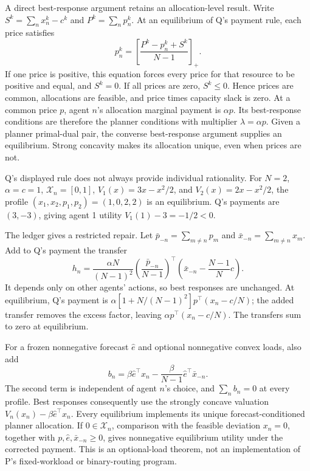 \documentclass{article}
\begin{document}
A direct best-response argument retains an allocation-level result. Write \(S^k=\sum_n x_n^k-c^k\) and \(P^k=\sum_n p_n^k\). At an equilibrium of Q's payment rule, each price satisfies
\[
p_n^k=\left[\frac{P^k-p_n^k+S^k}{N-1}\right]_+.
\]
If one price is positive, this equation forces every price for that resource to be positive and equal, and \(S^k=0\). If all prices are zero, \(S^k\leq0\). Hence prices are common, allocations are feasible, and price times capacity slack is zero. At a common price \(p\), agent \(n\)'s allocation marginal payment is \(\alpha p\). Its best-response conditions are therefore the planner conditions with multiplier \(\lambda=\alpha p\). Given a planner primal-dual pair, the converse best-response argument supplies an equilibrium. Strong concavity makes its allocation unique, even when prices are not. 

\begin{objection}
Q's displayed rule does not always provide individual rationality. For \(N=2\), \(\alpha=c=1\), \(\mathcal X_n=[0,1]\), \(V_1(x)=3x-x^2/2\), and \(V_2(x)=2x-x^2/2\), the profile \((x_1,x_2,p_1,p_2)=(1,0,2,2)\) is an equilibrium. Q's payments are \((3,-3)\), giving agent 1 utility \(V_1(1)-3=-1/2<0\). 
\end{objection}

The ledger gives a restricted repair. Let \(\bar p_{-n}=\sum_{m\ne n}p_m\) and \(\bar x_{-n}=\sum_{m\ne n}x_m\). Add to Q's payment the transfer
\[
h_n=
\frac{\alpha N}{(N-1)^2}
\left(\frac{\bar p_{-n}}{N-1}\right)^\top
\left(\bar x_{-n}-\frac{N-1}{N}c\right).
\]
It depends only on other agents' actions, so best responses are unchanged. At equilibrium, Q's payment is
\(\alpha[1+N/(N-1)^2]p^\top(x_n-c/N)\); the added transfer removes the excess factor, leaving \(\alpha p^\top(x_n-c/N)\). The transfers sum to zero at equilibrium. 

For a frozen nonnegative forecast \(\hat e\) and optional nonnegative convex loads, also add
\[
b_n=\beta\hat e^\top x_n
-\frac{\beta}{N-1}\hat e^\top\bar x_{-n}.
\]
The second term is independent of agent \(n\)'s choice, and \(\sum_n b_n=0\) at every profile. Best responses consequently use the strongly concave valuation \(V_n(x_n)-\beta\hat e^\top x_n\). Every equilibrium implements its unique forecast-conditioned planner allocation. If \(0\in\mathcal X_n\), comparison with the feasible deviation \(x_n=0\), together with \(p,\hat e,\bar x_{-n}\geq0\), gives nonnegative equilibrium utility under the corrected payment. This is an optional-load theorem, not an implementation of P's fixed-workload or binary-routing program. 
\end{document}
